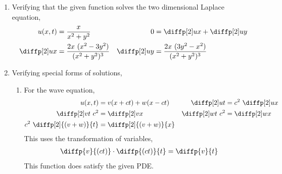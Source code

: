 \begin{enumerate}
    \item Verifying that the given function solves the two dimensional Laplace equation,
          \begin{align}
              u(x,t)       & = \frac{x}{x^2 + y^2}                    &
              0            & = \diffp[2] ux + \diffp[2] uy              \\
              \diffp[2] ux & = \frac{2x\ (x^2 - 3y^2)}{(x^2 + y^2)^3} &
              \diffp[2] uy & = \frac{2x\ (3y^2 - x^2)}{(x^2 + y^2)^3}
          \end{align}
          \begin{figure}[H]
              \centering
          \end{figure}

    \item Verifying special forms of solutions,
          \begin{enumerate}
              \item For the wave equation,
                    \begin{align}
                        u(x, t)                     & = v(x + ct) + w(x - ct) &
                        \diffp[2] ut                & = c^2\ \diffp[2] ux       \\
                        \diffp[2] vt\ c^2           & = \diffp[2] vx          &
                        \diffp[2] wt\ c^2           & = \diffp[2] wx            \\
                        c^2\ \diffp[2] {(v + w)}{t} & = \diffp[2]{(v+w)}{x}
                    \end{align}
                    This uses the transformation of variables,
                    \begin{align}
                        \diffp {v}{(ct)} \cdot \diffp {(ct)}{t} = \diffp {v}{t}
                    \end{align}
                    This function does satisfy the given PDE.


\end{enumerate}
\end{enumerate}
